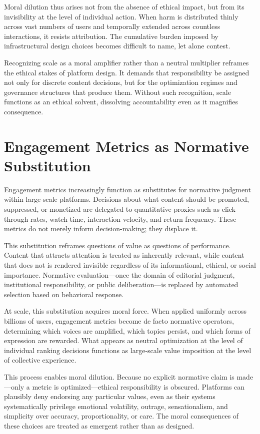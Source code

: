 \documentclass[12pt]{article}
\begin{document}
Moral dilution thus arises not from the absence of ethical impact, but from its invisibility at the level of individual action. When harm is distributed thinly across vast numbers of users and temporally extended across countless interactions, it resists attribution. The cumulative burden imposed by infrastructural design choices becomes difficult to name, let alone contest.

Recognizing scale as a moral amplifier rather than a neutral multiplier reframes the ethical stakes of platform design. It demands that responsibility be assigned not only for discrete content decisions, but for the optimization regimes and governance structures that produce them. Without such recognition, scale functions as an ethical solvent, dissolving accountability even as it magnifies consequence.

\section{Engagement Metrics as Normative Substitution}

Engagement metrics increasingly function as substitutes for normative judgment within large-scale platforms. Decisions about what content should be promoted, suppressed, or monetized are delegated to quantitative proxies such as click-through rates, watch time, interaction velocity, and return frequency. These metrics do not merely inform decision-making; they displace it.

This substitution reframes questions of value as questions of performance. Content that attracts attention is treated as inherently relevant, while content that does not is rendered invisible regardless of its informational, ethical, or social importance. Normative evaluation—once the domain of editorial judgment, institutional responsibility, or public deliberation—is replaced by automated selection based on behavioral response.

At scale, this substitution acquires moral force. When applied uniformly across billions of users, engagement metrics become de facto normative operators, determining which voices are amplified, which topics persist, and which forms of expression are rewarded. What appears as neutral optimization at the level of individual ranking decisions functions as large-scale value imposition at the level of collective experience.

This process enables moral dilution. Because no explicit normative claim is made—only a metric is optimized—ethical responsibility is obscured. Platforms can plausibly deny endorsing any particular values, even as their systems systematically privilege emotional volatility, outrage, sensationalism, and simplicity over accuracy, proportionality, or care. The moral consequences of these choices are treated as emergent rather than as designed.
\end{document}
